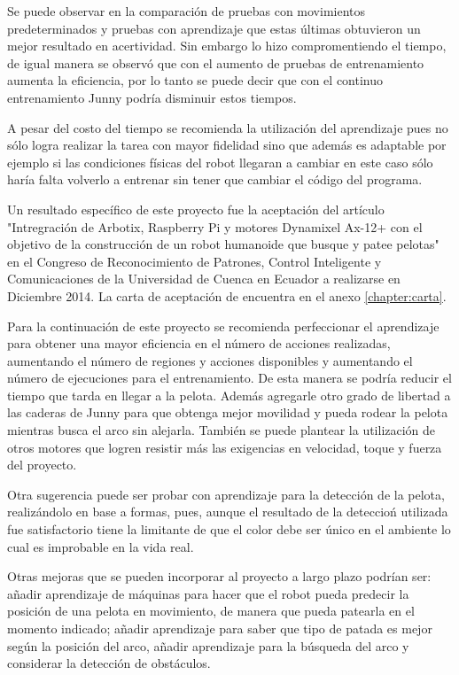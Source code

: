 Se puede observar en la comparaci\'on de pruebas con movimientos predeterminados y pruebas con aprendizaje que estas \'ultimas obtuvieron un mejor resultado en acertividad. Sin embargo  lo hizo compromentiendo el tiempo, de igual manera se observ\'o que con el aumento de pruebas de entrenamiento aumenta la eficiencia, por lo tanto se puede decir que con el continuo entrenamiento Junny podr\'ia disminuir estos tiempos. 

A pesar del costo del tiempo se recomienda la utilizaci\'on del aprendizaje pues no s\'olo logra realizar la tarea con mayor fidelidad sino que adem\'as es adaptable por ejemplo si las condiciones f\'isicas del robot llegaran a cambiar en este caso s\'olo haría falta volverlo a entrenar sin tener que cambiar el código del programa.

Un resultado espec\'ifico de este proyecto fue la aceptaci\'on del art\'iculo "Intregraci\'on de Arbotix, Raspberry Pi y motores Dynamixel Ax-12+ con el objetivo de la construcción de un robot humanoide que busque y patee pelotas" \cite{junny} en el Congreso de Reconocimiento de Patrones, Control Inteligente y Comunicaciones de la Universidad de Cuenca en Ecuador a realizarse en Diciembre 2014. La carta de aceptaci\'on de encuentra en el anexo \ref{chapter:carta}.

Para la continuaci\'on de este proyecto se recomienda perfeccionar el aprendizaje para obtener una mayor eficiencia en el n\'umero de acciones realizadas, aumentando el número de regiones y acciones disponibles y aumentando el número de ejecuciones para el entrenamiento. De esta manera se podría reducir el tiempo que tarda en llegar a la pelota. Además agregarle otro grado de libertad a las 
caderas de Junny para que obtenga mejor movilidad y pueda rodear la pelota mientras busca el arco sin alejarla. Tambi\'en se puede plantear la utilizaci\'on de otros motores que logren resistir m\'as las exigencias en velocidad, toque y fuerza del proyecto.

Otra sugerencia puede ser probar con aprendizaje para la detecci\'on de la pelota, realiz\'andolo en base a formas, pues, aunque el resultado de la deteccio\'n utilizada fue satisfactorio tiene la limitante de que el color debe ser \'unico en el ambiente lo cual es improbable en la vida real.  

Otras mejoras que se pueden incorporar al proyecto a largo plazo podrían ser: añadir aprendizaje de m\'aquinas para hacer que el robot pueda predecir la posición de una pelota en movimiento, de manera que pueda patearla en el momento indicado; a\~nadir aprendizaje para saber que tipo de patada es mejor seg\'un la posición del arco, a\~nadir aprendizaje para la búsqueda del arco y considerar la detecci\'on de obst\'aculos.

